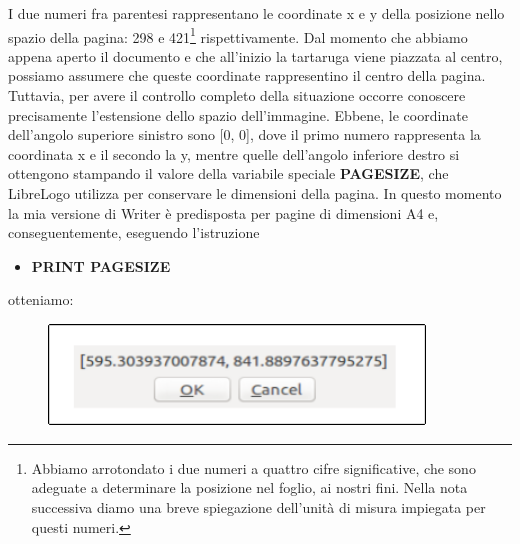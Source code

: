 I due numeri fra parentesi rappresentano le coordinate x e y della posizione nello spazio della pagina: 298 e 421\footnote{Abbiamo arrotondato i due numeri a quattro cifre significative, che sono adeguate a determinare la posizione nel foglio, ai nostri fini. Nella nota successiva diamo una breve spiegazione dell'unità di misura impiegata per questi numeri.} rispettivamente. Dal momento che abbiamo appena aperto il documento e che all'inizio la tartaruga viene piazzata al centro, possiamo assumere che queste coordinate rappresentino il centro della pagina. Tuttavia, per avere il controllo completo della situazione occorre conoscere precisamente l'estensione dello spazio dell'immagine.  Ebbene, le coordinate dell'angolo superiore sinistro sono [0, 0], dove il primo numero rappresenta la coordinata x e il secondo la y, mentre quelle dell'angolo inferiore destro si ottengono stampando il valore della variabile speciale \textbf{PAGESIZE}, che LibreLogo utilizza per conservare le dimensioni della pagina. In questo momento la mia versione di Writer è predisposta per pagine di dimensioni A4 e, conseguentemente, eseguendo l'istruzione 

\vskip 1cm

\begin{scriptsize}
\begin{minipage}{1.0\textwidth}
\begin{itemize}[itemsep=-3pt,parsep=2pt]
\item[] \textbf{PRINT PAGESIZE}
\end{itemize}
\end{minipage}
\end{scriptsize}

\vskip 1cm

otteniamo:

\vskip 1cm

\begin{figure}[H]
   \centering
   \includegraphics[width=10.0cm,trim=8 8 8 8,clip]{./images/disegnare/disegnare-29.png}
   \label{dis-29}
\end{figure}

\vskip 1cm

